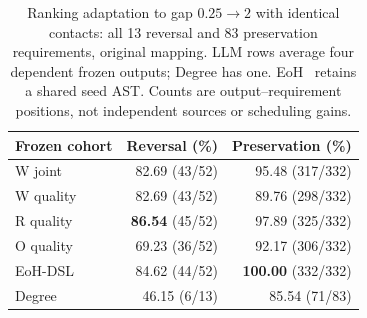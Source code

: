 \begin{table}[!t]
  \centering
  \caption{Ranking adaptation to gap $0.25\!\to\!2$ with identical contacts:
  all 13 reversal and 83 preservation requirements, original mapping.
  LLM rows average four dependent frozen outputs; Degree has one.
  EoH~\cite{liu2024eoh} retains a shared seed AST. Counts are output--requirement
  positions, not independent sources or scheduling gains.}
  \label{tab:v06-paired-adaptation}
  \setlength{\tabcolsep}{4pt}
  \begin{tabular}{lrr}
  \toprule
  Frozen cohort & Reversal (\%) & Preservation (\%) \\
  \midrule
  W joint & 82.69 (43/52) & 95.48 (317/332) \\
  W quality & 82.69 (43/52) & 89.76 (298/332) \\
  R quality & \textbf{86.54} (45/52) & 97.89 (325/332) \\
  O quality & 69.23 (36/52) & 92.17 (306/332) \\
  EoH-DSL & 84.62 (44/52) & \textbf{100.00} (332/332) \\
  Degree & 46.15 (6/13) & 85.54 (71/83) \\
  \bottomrule
  \end{tabular}
\end{table}
